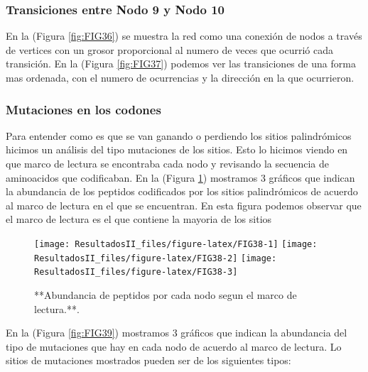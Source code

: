 \documentclass[
]{book}
\begin{document}
\hypertarget{transiciones-entre-nodo-9-y-nodo-10-3}{%
\subsubsection{Transiciones entre Nodo 9 y Nodo 10}\label{transiciones-entre-nodo-9-y-nodo-10-3}}

En la (Figura \ref{fig:FIG36}) se muestra la red como una conexión de nodos a través de vertices con un grosor proporcional al numero de veces que ocurrió cada transición. En la (Figura \ref{fig:FIG37}) podemos ver las transiciones de una forma mas ordenada, con el numero de ocurrencias y la dirección en la que ocurrieron.

\hypertarget{mutaciones-en-los-codones-3}{%
\subsubsection{Mutaciones en los codones}\label{mutaciones-en-los-codones-3}}

Para entender como es que se van ganando o perdiendo los sitios palindrómicos hicimos un análisis del tipo mutaciones de los sitios. Esto lo hicimos viendo en que marco de lectura se encontraba cada nodo y revisando la secuencia de aminoacidos que codificaban. En la (Figura \ref{fig:FIG38}) mostramos 3 gráficos que indican la abundancia de los peptidos codificados por los sitios palindrómicos de acuerdo al marco de lectura en el que se encuentran. En esta figura podemos observar que el marco de lectura es el que contiene la mayoria de los sitios

\begin{figure}

{\centering \texttt{[image: ResultadosII\_files/figure-latex/FIG38-1]} \texttt{[image: ResultadosII\_files/figure-latex/FIG38-2]} \texttt{[image: ResultadosII\_files/figure-latex/FIG38-3]} 

}

\caption{**Abundancia de peptidos por cada nodo segun el marco de lectura.**.}\label{fig:FIG38}
\end{figure}

En la (Figura \ref{fig:FIG39}) mostramos 3 gráficos que indican la abundancia del tipo de mutaciones que hay en cada nodo de acuerdo al marco de lectura. Lo sitios de mutaciones mostrados pueden ser de los siguientes tipos:
\end{document}
